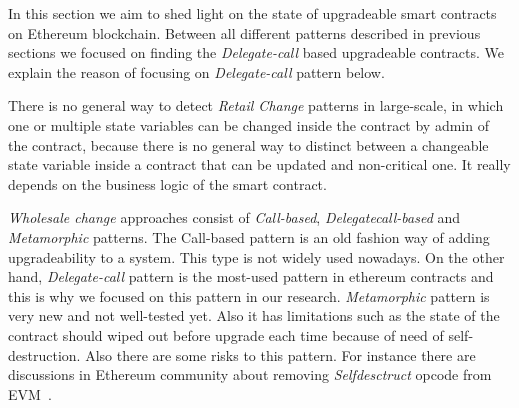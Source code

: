 In this section we aim to shed light on the state of upgradeable smart contracts on Ethereum blockchain. Between all different patterns described in previous sections we focused on finding the \textit{Delegate-call} based upgradeable contracts. We explain the reason of focusing on \textit{Delegate-call} pattern below. 

There is no general way to detect \textit{Retail Change} patterns in large-scale, in which one or multiple state variables can be changed inside the contract by admin of the contract, because there is no general way to distinct between a changeable state variable inside a contract that can be updated and non-critical one. It really depends on the business logic of the smart contract.

\textit{Wholesale change} approaches consist of \textit{Call-based}, \textit{Delegatecall-based} and \textit{Metamorphic} patterns. The Call-based pattern is an old fashion way of adding upgradeability to a system. This type is not widely used nowadays. On the other hand, \textit{Delegate-call}  pattern is the most-used pattern in ethereum contracts and this is why we focused on this pattern in our research. \textit{Metamorphic} pattern is very new and not well-tested yet. Also it has limitations such as the state of the contract should wiped out before upgrade each time because of need of self-destruction. Also there are some risks to this pattern. For instance there are discussions in Ethereum community about removing \textit{Selfdesctruct} opcode from EVM~\cite{selfDestruct}. 

